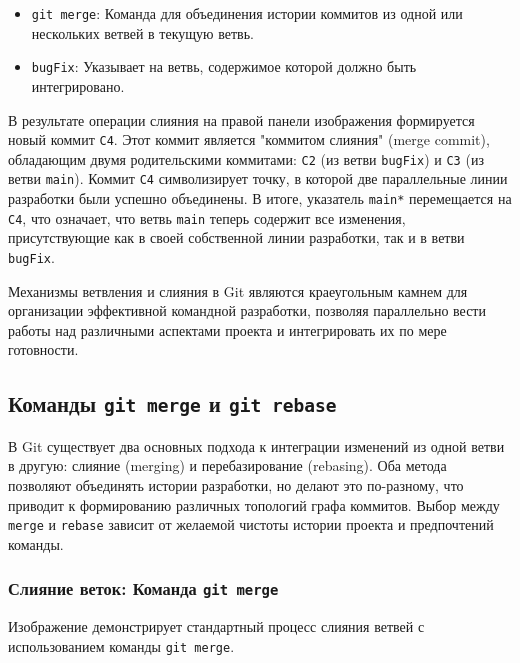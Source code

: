 \begin{itemize}
\begin{itemize}
        \item \texttt{git merge}: Команда для объединения истории коммитов из одной или нескольких ветвей в текущую ветвь.
        \item \texttt{bugFix}: Указывает на ветвь, содержимое которой должно быть интегрировано.
    \end{itemize}
    В результате операции слияния на правой панели изображения формируется новый коммит \texttt{C4}.
    Этот коммит является "коммитом слияния" (merge commit), обладающим двумя родительскими коммитами: \texttt{C2} (из ветви \texttt{bugFix}) и \texttt{C3} (из ветви \texttt{main}).
    Коммит \texttt{C4} символизирует точку, в которой две параллельные линии разработки были успешно объединены.
    В итоге, указатель \texttt{main*} перемещается на \texttt{C4}, что означает, что ветвь \texttt{main} теперь содержит все изменения, присутствующие как в своей собственной линии разработки, так и в ветви \texttt{bugFix}.
\end{itemize}
Механизмы ветвления и слияния в Git являются краеугольным камнем для организации эффективной командной разработки, позволяя параллельно вести работы над различными аспектами проекта и интегрировать их по мере готовности.

\subsection{Команды \texttt{git merge} и \texttt{git rebase}}\label{subsec:lgb-merge-and-rebase}
В Git существует два основных подхода к интеграции изменений из одной ветви в другую: слияние (merging) и перебазирование (rebasing).
Оба метода позволяют объединять истории разработки, но делают это по-разному, что приводит к формированию различных топологий графа коммитов.
Выбор между \texttt{merge} и \texttt{rebase} зависит от желаемой чистоты истории проекта и предпочтений команды.

\subsubsection{Слияние веток: Команда \texttt{git merge}}\label{subsubsec:git-merge}
Изображение  демонстрирует стандартный процесс слияния ветвей с использованием команды \texttt{git merge}.

\label{fig:lgb_merge}

